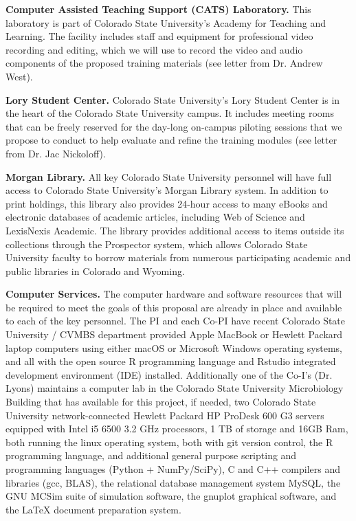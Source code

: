\documentclass[pdftex,english,11.5pt,parskip=half]{scrartcl}
\begin{document}
\textbf{Computer Assisted Teaching Support (CATS) Laboratory.} This laboratory is part of Colorado State University's Academy for Teaching and Learning. The facility includes staff and equipment for professional video recording and editing, which we will use to record the video and audio components of the proposed training materials (see letter from Dr. Andrew West). 

\textbf{Lory Student Center.} Colorado State University's Lory Student Center is in the heart of the Colorado State University campus. It includes meeting rooms that can be freely reserved for the day-long on-campus piloting sessions that we propose to conduct to help evaluate and refine the training modules (see letter from Dr. Jac Nickoloff).

\textbf{Morgan Library.} All key Colorado State University personnel will have full access to Colorado State University’s Morgan Library system. In addition to print holdings, this library also provides 24-hour access to many eBooks and electronic databases of academic articles, including Web of Science and LexisNexis Academic. The library provides additional access to items outside its collections through the Prospector system, which allows Colorado State University faculty to borrow materials from numerous participating academic and public libraries in Colorado and Wyoming. 

\textbf{Computer Services.} The computer hardware and software resources that
will be required to meet the goals of this proposal are already in place and
available to each of the key personnel.  The PI and each Co-PI have recent Colorado State University
/ CVMBS department provided Apple MacBook or Hewlett Packard laptop computers
using either macOS or Microsoft Windows operating systems, and all with the
open
source R programming language and Rstudio integrated development environment
(IDE) installed.  Additionally one of the Co-I's (Dr. Lyons) maintains a
computer lab in the Colorado State University Microbiology Building that has available for this
project, if needed, two Colorado State University network-connected Hewlett Packard HP ProDesk
600 G3 servers equipped with Intel i5 6500 3.2 GHz processors, 1 TB of
storage and 16GB Ram,  both running the linux operating system, both with
git version control, the R programming language, and additional
general purpose scripting and programming languages (Python + NumPy/SciPy),
C and C++ compilers and libraries (gcc, BLAS), the relational database
management system MySQL, the GNU MCSim suite of simulation software, the
gnuplot graphical software, and the LaTeX document preparation system.
\end{document}
